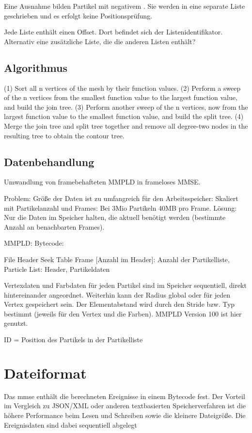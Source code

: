 Eine Ausnahme bilden Partikel mit negativem . Sie werden in eine separate Liste geschrieben und es erfolgt keine Positionsprüfung.

Jede Liste enthält einen Offset. Dort befindet sich der Listenidentifikator. Alternativ eine zusätzliche Liste, die die anderen Listen enthält?

\subsection{Algorithmus}
\cite{carr2001computingCountourTrees} \cite[S.~176]{chiang2005contourTreesUsingMonotonePaths}
(1) Sort all n vertices of the mesh by their function values.
(2) Perform a sweep of the n vertices from the smallest function value to the largest function value, and build the join tree.
(3) Perform another sweep of the n vertices, now from the largest function value to the smallest function value, and build the split tree.
(4) Merge the join tree and split tree together and remove all degree-two nodes in the resulting tree to obtain the contour tree.

\subsection{Datenbehandlung}
Umwandlung von framebehafteten MMPLD in frameloses MMSE.

Problem: Größe der Daten ist zu umfangreich für den Arbeitsspeicher: Skaliert mit Partikelanzahl und Frames: Bei 3Mio Partikeln 40MB pro Frame.
Lösung: Nur die Daten im Speicher halten, die aktuell benötigt werden (bestimmte Anzahl an benachbarten Frames).



MMPLD: Bytecode:

File Header
Seek Table
Frame [Anzahl im Header]: Anzahl der Partikelliste, Particle List: Header, Partikeldaten

Vertexdaten und Farbdaten für jeden Partikel sind im Speicher sequentiell, direkt hintereinander angeordnet. Weiterhin kann der Radius global oder für jeden Vertex gespeichert sein.\cite[S.~3]{FileFormatSpecificationMMPLD} Der Elementabstand wird durch den Stride bzw. Typ bestimmt (jeweils für den Vertex und die Farben). MMPLD Version 100 ist hier genutzt.

ID = Position des Partikels in der Partikelliste

\section{Dateiformat}
Das \gls{mmse} enthält die berechneten Ereignisse in einem Bytecode fest. Der Vorteil im Vergleich zu JSON/XML oder anderen textbasierten Speicherverfahren ist die höhere Performance beim Lesen und Schreiben sowie die kleinere Dateigröße. Die Ereignisdaten sind dabei sequentiell abgelegt


